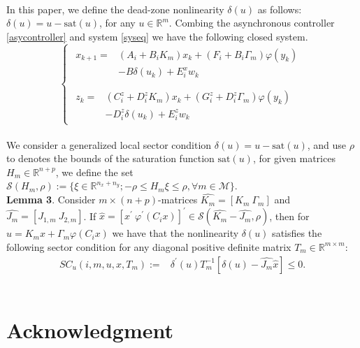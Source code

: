 \documentclass[conference]{IEEEtran}
\begin{document}
\\
In this paper, we define the dead-zone nonlinearity $\delta(u)$ as follows:$\delta(u)=u-\mathrm{sat}(u)$, for any $u\in\mathbb{R}^{m}$. Combing the asynchronous controller \eqref{asycontroller} and system \eqref{syseq} we have the following closed system.
\begin{equation}\label{close_system_equation}
\left\{
\begin{array}{lr}
\begin{split}
x_{k+1}=&(A_i+B_iK_m)x_k+(F_i+B_i\varGamma_m)\varphi(y_k)\\
		&-B\delta(u_k)+E_i^xw_k\\
\end{split}
\\
\begin{split}
z_k=&(C^z_i+D_i^zK_m)x_k+(G^z_i+D^z_i\varGamma_m)\varphi(y_k)\\
&-D_i^z\delta(u_k)+E^z_iw_k
\end{split}
\end{array}
\right.
\end{equation} 
\\
We consider a generalized local sector condition $\delta(u)=u-\mathrm{sat}(u)$, and use $\rho$ to denotes the bounds of the saturation function $\mathrm{sat}(u)$, for given matrices $H_m\in\mathbb{R}^{n+p}$, we define the set $\mathcal{S}(H_m,\rho):=\{\xi\in\mathbb{R}^{n_x+n_y};-\rho\leq H_m\xi\leq\rho, \forall m\in \mathcal{M} \}$.
\\
\textbf{Lemma 3}. Consider $m\times(n+p)$-matrices $\widehat{K_m}=[K_m \ \varGamma_m]$ and $\widehat{J_m}=[J_{1,m} \ J_{2,m}]$. If $\widehat{x}=[x^{'} \ \varphi^{'}(C_ix) ]^{'} \in \mathcal{S}(\widehat{K_m}-\widehat{J_m},\rho)$, then for $u=K_mx+\varGamma_m\varphi(C_ix)$ we have that the nonlinearity $\delta(u)$ satisfies the following sector condition for any diagonal positive definite matrix $T_m\in\mathbb{R}^{m\times m}$:
\begin{equation}
\begin{split}
SC_u(i,m,u,x,T_m):= &\delta^{'}(u)T_m^{-1}[\delta(u)-\widehat{J_m}\widehat{x}]\leq 0.
\end{split}
\end{equation}
\\





\section*{Acknowledgment}
\end{document}
